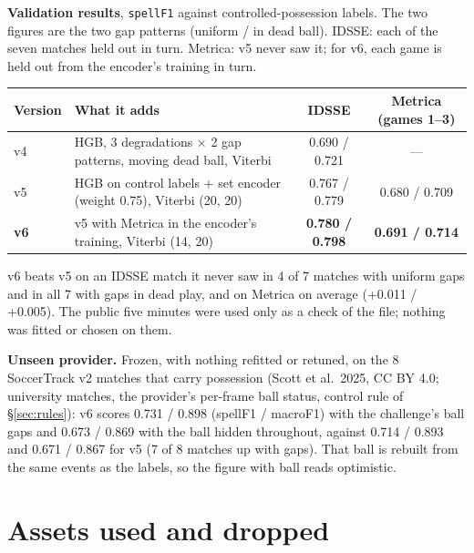 \documentclass[10pt,a4paper]{article}
\newcommand{\code}[1]{\texttt{#1}}
\begin{document}
\noindent\begin{minipage}{\textwidth}
\setlength{\parskip}{0.5em}
\textbf{Validation results}, \code{spellF1} against controlled-possession labels. The two figures
are the two gap patterns (uniform / in dead ball). IDSSE: each of the seven matches held out in
turn. Metrica: v5 never saw it; for v6, each game is held out from the encoder's training in turn.

\begin{center}
\begin{tabularx}{\textwidth}{l L c c}
\toprule
Version & What it adds & IDSSE & Metrica (games 1--3) \\
\midrule
v4 & HGB, 3 degradations $\times$ 2 gap patterns, moving dead ball, Viterbi & 0.690 / 0.721 & --- \\
v5 & HGB on control labels + set encoder (weight 0.75), Viterbi (20, 20) & 0.767 / 0.779 & 0.680 / 0.709 \\
\textbf{v6} & v5 with Metrica in the encoder's training, Viterbi (14, 20) & \textbf{0.780 / 0.798} & \textbf{0.691 / 0.714} \\
\bottomrule
\end{tabularx}
\end{center}
\end{minipage}

v6 beats v5 on an IDSSE match it never saw in 4 of 7 matches with uniform gaps and in all 7 with
gaps in dead play, and on Metrica on average (+0.011 / +0.005). The public five minutes were used
only as a check of the file; nothing was fitted or chosen on them.

\textbf{Unseen provider.} Frozen, with nothing refitted or retuned, on the 8 SoccerTrack v2 matches
that carry possession (Scott et al.\ 2025, CC BY 4.0; university matches, the provider's per-frame
ball status, control rule of \S\ref{sec:rules}): v6 scores 0.731 / 0.898 (spellF1 / macroF1) with
the challenge's ball gaps and 0.673 / 0.869 with the ball hidden throughout, against 0.714 / 0.893
and 0.671 / 0.867 for v5 (7 of 8 matches up with gaps). That ball is rebuilt from the same events
as the labels, so the figure with ball reads optimistic.

\section{Assets used and dropped}
\end{document}
